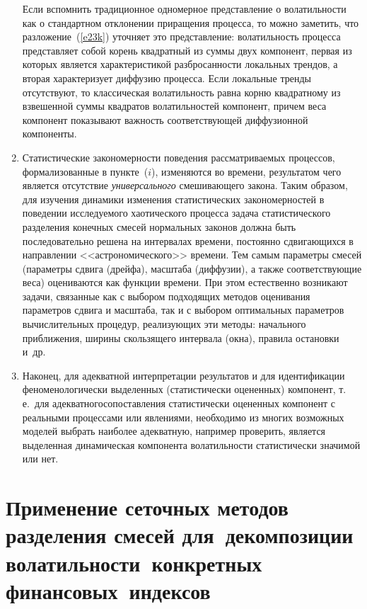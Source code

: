 \begin{multicols}{2}
\begin{enumerate}[($i$)]
Если вспомнить традиционное одномерное представление о
волатильности как о стандартном отклонении приращения процесса, то
можно заметить, что разложение~(\ref{e23k}) уточняет это представление:
волатильность процесса представляет собой корень квадратный из
суммы двух компонент, первая из которых является характеристикой
разбросанности локальных трендов, а вторая характеризует диффузию
процесса. Если локальные тренды отсутствуют, то классическая
волатильность равна корню квадратному из взвешенной суммы
квадратов волатильностей\linebreak
 компонент, причем веса компонент
показывают важность соответствующей диффузионной компоненты.
\item
Статистические закономерности поведения
рассматриваемых процессов, формализованные в пункте~($i$),
изменяются во времени, результатом чего является отсутствие {\it
универсального} смешивающего закона. Таким образом, для изучения
динамики изменения статистических закономерностей в поведении
исследуемого хаотического процесса задача статистического
разделения конечных смесей нормальных законов должна быть
последовательно решена на интервалах времени, постоянно
сдвигающихся в направлении <<астрономического>> времени. Тем самым
параметры смесей (параметры сдвига (дрейфа), масштаба (диффузии),
а также соответствующие веса) оцениваются как функции времени. При
этом естественно возникают задачи, связанные как с выбором
подходящих методов оценивания параметров сдвига и масштаба, так и
с выбором оптимальных параметров вычислительных процедур,
реализующих эти методы: начального приближения, ширины скользящего
интервала (окна), правила остановки и~др.
\item
Наконец, для адекватной интерпретации результатов и
для идентификации фено\-ме\-нологически выделенных (статистически
оцененных) компонент, т.\,е.\ для адекватного\linebreak сопоставления
статистически оцененных компонент с реальными процессами или
явлениями, необходимо из многих возможных моделей выбрать наиболее
адекватную, например проверить, является выделенная динамическая
компонента волатильности статистически значимой или нет.
\end{enumerate}

\section{Применение сеточных методов разделения смесей для~декомпозиции 
волатильности~конкретных финансовых~индексов}


\end{multicols}
